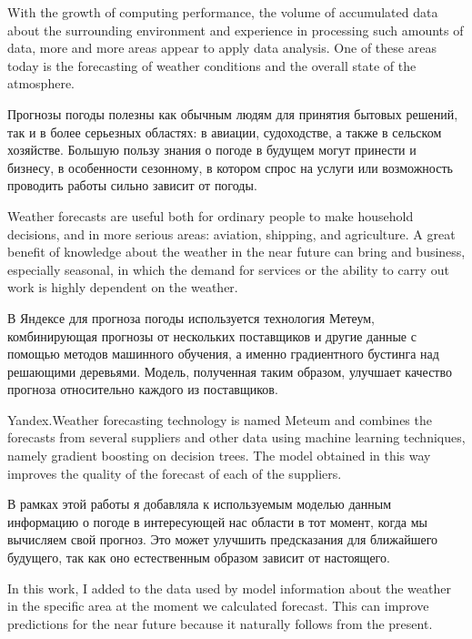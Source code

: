 \documentclass[14pt]{matmex-diploma}
\begin{document}
With the growth of computing performance, the volume of accumulated data about the surrounding environment and experience in processing such amounts of data, more and more areas appear to apply data analysis. One of these areas today is the forecasting of weather conditions and the overall state of the atmosphere.

Прогнозы погоды полезны как обычным людям для принятия бытовых решений, так и в более серьезных областях: в авиации, судоходстве, а также в сельском хозяйстве. Большую пользу знания о погоде в будущем могут принести и бизнесу, в особенности сезонному, в котором спрос на услуги или возможность проводить работы сильно зависит от погоды.

Weather forecasts are useful both for ordinary people to make household decisions, and in more serious areas: aviation, shipping, and agriculture.  A great benefit of knowledge about the weather in the near future can bring and business, especially seasonal, in which the demand for services or the ability to carry out work is highly dependent on the weather.

В Яндексе для прогноза погоды используется технология Метеум, комбинирующая прогнозы от нескольких поставщиков и другие данные с помощью методов машинного обучения, а именно градиентного бустинга над решающими деревьями. Модель, полученная таким образом, улучшает качество прогноза относительно каждого из поставщиков.

Yandex.Weather forecasting technology is named Meteum and combines the forecasts from several suppliers and other data using machine learning techniques, namely gradient boosting on decision trees. The model obtained in this way improves the quality of the forecast of each of the suppliers.

В рамках этой работы я добавляла к используемым моделью данным информацию о погоде в интересующей нас области в тот момент, когда мы вычисляем свой прогноз. Это может улучшить предсказания для ближайшего будущего, так как оно естественным образом зависит от настоящего.

In this work, I added to the data used by model information about the weather in the specific area at the moment we calculated forecast. This can improve predictions for the near future because it naturally follows from the present.



\end{document}
